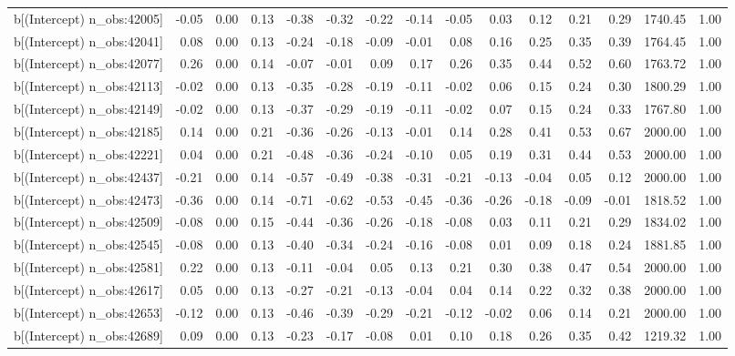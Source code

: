 \begin{table}[ht]
\begin{tabular}{rrrrrrrrrrrrrrr}
  b[(Intercept) n\_obs:42005] & -0.05 & 0.00 & 0.13 & -0.38 & -0.32 & -0.22 & -0.14 & -0.05 & 0.03 & 0.12 & 0.21 & 0.29 & 1740.45 & 1.00 \\ 
  b[(Intercept) n\_obs:42041] & 0.08 & 0.00 & 0.13 & -0.24 & -0.18 & -0.09 & -0.01 & 0.08 & 0.16 & 0.25 & 0.35 & 0.39 & 1764.45 & 1.00 \\ 
  b[(Intercept) n\_obs:42077] & 0.26 & 0.00 & 0.14 & -0.07 & -0.01 & 0.09 & 0.17 & 0.26 & 0.35 & 0.44 & 0.52 & 0.60 & 1763.72 & 1.00 \\ 
  b[(Intercept) n\_obs:42113] & -0.02 & 0.00 & 0.13 & -0.35 & -0.28 & -0.19 & -0.11 & -0.02 & 0.06 & 0.15 & 0.24 & 0.30 & 1800.29 & 1.00 \\ 
  b[(Intercept) n\_obs:42149] & -0.02 & 0.00 & 0.13 & -0.37 & -0.29 & -0.19 & -0.11 & -0.02 & 0.07 & 0.15 & 0.24 & 0.33 & 1767.80 & 1.00 \\ 
  b[(Intercept) n\_obs:42185] & 0.14 & 0.00 & 0.21 & -0.36 & -0.26 & -0.13 & -0.01 & 0.14 & 0.28 & 0.41 & 0.53 & 0.67 & 2000.00 & 1.00 \\ 
  b[(Intercept) n\_obs:42221] & 0.04 & 0.00 & 0.21 & -0.48 & -0.36 & -0.24 & -0.10 & 0.05 & 0.19 & 0.31 & 0.44 & 0.53 & 2000.00 & 1.00 \\ 
  b[(Intercept) n\_obs:42437] & -0.21 & 0.00 & 0.14 & -0.57 & -0.49 & -0.38 & -0.31 & -0.21 & -0.13 & -0.04 & 0.05 & 0.12 & 2000.00 & 1.00 \\ 
  b[(Intercept) n\_obs:42473] & -0.36 & 0.00 & 0.14 & -0.71 & -0.62 & -0.53 & -0.45 & -0.36 & -0.26 & -0.18 & -0.09 & -0.01 & 1818.52 & 1.00 \\ 
  b[(Intercept) n\_obs:42509] & -0.08 & 0.00 & 0.15 & -0.44 & -0.36 & -0.26 & -0.18 & -0.08 & 0.03 & 0.11 & 0.21 & 0.29 & 1834.02 & 1.00 \\ 
  b[(Intercept) n\_obs:42545] & -0.08 & 0.00 & 0.13 & -0.40 & -0.34 & -0.24 & -0.16 & -0.08 & 0.01 & 0.09 & 0.18 & 0.24 & 1881.85 & 1.00 \\ 
  b[(Intercept) n\_obs:42581] & 0.22 & 0.00 & 0.13 & -0.11 & -0.04 & 0.05 & 0.13 & 0.21 & 0.30 & 0.38 & 0.47 & 0.54 & 2000.00 & 1.00 \\ 
  b[(Intercept) n\_obs:42617] & 0.05 & 0.00 & 0.13 & -0.27 & -0.21 & -0.13 & -0.04 & 0.04 & 0.14 & 0.22 & 0.32 & 0.38 & 2000.00 & 1.00 \\ 
  b[(Intercept) n\_obs:42653] & -0.12 & 0.00 & 0.13 & -0.46 & -0.39 & -0.29 & -0.21 & -0.12 & -0.02 & 0.06 & 0.14 & 0.21 & 2000.00 & 1.00 \\ 
  b[(Intercept) n\_obs:42689] & 0.09 & 0.00 & 0.13 & -0.23 & -0.17 & -0.08 & 0.01 & 0.10 & 0.18 & 0.26 & 0.35 & 0.42 & 1219.32 & 1.00 \\ 

\end{tabular}
\end{table}

